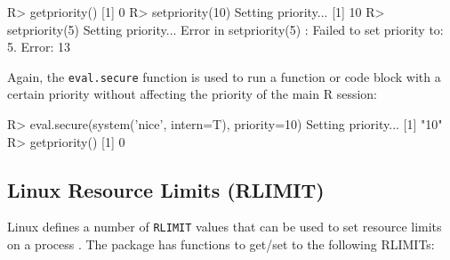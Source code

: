 \documentclass[article]{jss}
\newcommand{\R}{\textsf{R}\xspace}
\newcommand{\RAppArmor}{\pkg{RAppArmor}\xspace}
\begin{document}
\begin{CodeChunk}
\begin{CodeInput}
R> getpriority()
[1] 0
R> setpriority(10)
Setting priority...
[1] 10
R> setpriority(5)
Setting priority...
Error in setpriority(5) : Failed to set priority to: 5.
Error: 13
\end{CodeInput}
\end{CodeChunk}

Again, the \texttt{eval.secure} function is used to run a function or code block
with a certain priority without affecting the priority of the main \R session:

\begin{CodeChunk}
\begin{CodeInput}
R> eval.secure(system('nice', intern=T), priority=10)
Setting priority...
[1] "10"
R> getpriority()
[1] 0
\end{CodeInput}
\end{CodeChunk}


\subsection{Linux Resource Limits (RLIMIT)}
\label{RLIMITS}

Linux defines a number of \texttt{RLIMIT} values that can be used to set
resource limits on a process \citep{linuxrlimit}. The \RAppArmor package
has functions to get/set to the following RLIMITs:
\end{document}

